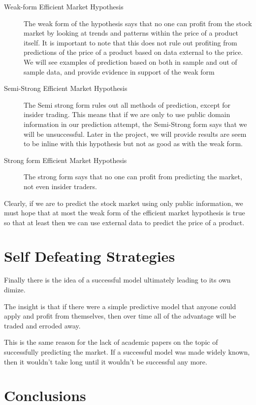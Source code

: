 \documentclass{report}
\begin{document}
\begin{description}
  \item[Weak-form Efficient Market Hypothesis] 
  The weak form of the hypothesis says that no one can profit from the stock market by looking at trends and patterns within the price of a product itself. It is important to note that this does not rule out profiting from predictions of the price of a product based on data external to the price. We will see examples of prediction based on both in sample and out of sample data, and provide evidence in support of the weak form
  
  \item[Semi-Strong Efficient Market Hypothesis]
  The Semi strong form rules out all methods of prediction, except for insider trading. This means that if we are only to use public domain information in our prediction attempt, the Semi-Strong form says that we will be unsuccessful. Later in the project, we will provide results are seem to be inline with this hypothesis but not as good as with the weak form.
  
  \item[Strong form Efficient Market Hypothesis]
  The strong form says that no one can profit from predicting the market, not even insider traders.
\end{description}


Clearly, if we are to predict the stock market using only public information, we must hope that at most the weak form of the efficient market hypothesis is true so that at least then we can use external data to predict the price of a product.

\section{Self Defeating Strategies}

Finally there is the idea of a successful model ultimately leading to its own dimize. 

The insight is that if there were a simple predictive model that anyone could apply and profit from themselves, then over time all of the advantage will be traded and erroded away.

This is the same reason for the lack of academic papers on the topic of successfully predicting the market. If a successful model was made widely known, then it wouldn't take long until it wouldn't be successful any more.

\section{Conclusions}
\end{document}
